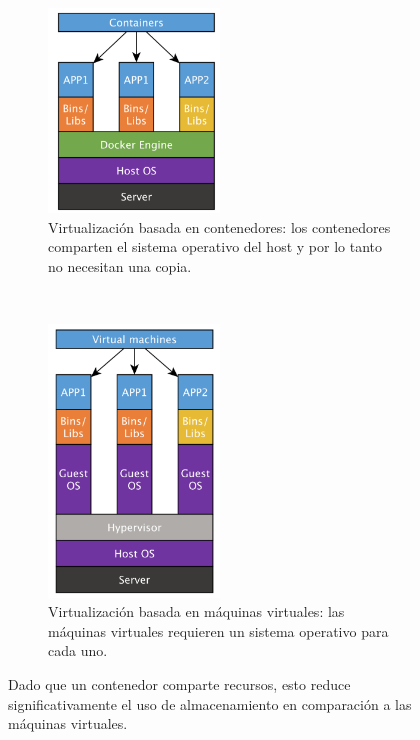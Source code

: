 \begin{figure}[]
    \centering
    \begin{subfigure}[b]{0.5\textwidth}
         \centering
    	\includegraphics[width=0.5\textwidth]{Figures/containers.png}
    	\caption{Virtualización basada en contenedores: los contenedores comparten el sistema operativo del host y por lo tanto no necesitan una copia.}
    	\label{fig:contenedor-arch}
     \end{subfigure}
    ~ 
    \begin{subfigure}[b]{0.5\textwidth}
         \centering
    	\includegraphics[width=0.5\textwidth]{Figures/virtual.png}
    	\caption{Virtualización basada en máquinas virtuales: las máquinas virtuales requieren un sistema operativo para cada uno.}
    	\label{fig:vm-arch}
     \end{subfigure}
        \caption{Dado que un contenedor comparte recursos, esto reduce significativamente el uso de almacenamiento en comparación a las máquinas virtuales.}
        \label{fig:dependencies-graph}
\end{figure}

